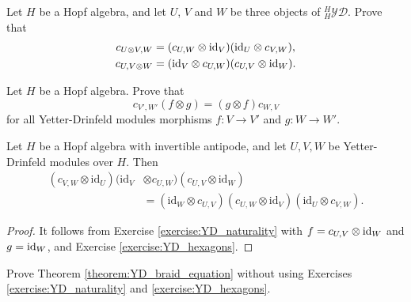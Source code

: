 \begin{exercise}
\label{exercise:YD_hexagons}
Let $H$ be a Hopf algebra, and let $U$, $V$ and $W$
be three objects of $_H^H\mathcal{YD}$. Prove that 
\begin{align}
c_{U\otimes V,W} & =(c_{U,W}\otimes\id_{V})(\id_{U}\otimes c_{V,W}),\label{eq:(cx1)(1xc)}\\
c_{U,V\otimes W} & =(\id_{V}\otimes c_{U,W})(c_{U,V}\otimes\id_{W}).\label{eq:(1xc)(cx1)}
\end{align}
\end{exercise}

\begin{exercise}
\label{exercise:YD_naturality}
Let $H$ be a Hopf algebra. Prove that 
\[
c_{V',W'}(f\otimes g)=(g\otimes f)c_{W,V}
\]
for all Yetter-Drinfeld modules morphisms $f:V\to V'$ and $g:W\to W'$. 
\end{exercise}

\begin{theorem}
\label{theorem:YD_braid_equation}
Let $H$ be a Hopf algebra with invertible antipode, and let $U,V,W$
be Yetter-Drinfeld modules over $H$. Then 
\begin{align*}
(c_{V,W}\otimes\textrm{id}_{U})(\textrm{id}_{V}&\otimes c_{U,W})(c_{U,V}\otimes\textrm{id}_{W})\\
&=(\textrm{id}_{W}\otimes c_{U,V})(c_{U,W}\otimes\textrm{id}_{V})(\textrm{id}_{U}\otimes c_{V,W}).
\end{align*}
\end{theorem}

\begin{proof}
It follows from Exercise \eqref{exercise:YD_naturality} with
$f=c_{U,V}\otimes\mathrm{id}_W$ and $g=\mathrm{id}_W$, and Exercise
\eqref{exercise:YD_hexagons}.
\end{proof}

\begin{exercise}
Prove Theorem \ref{theorem:YD_braid_equation} without using Exercises
\ref{exercise:YD_naturality} and \ref{exercise:YD_hexagons}.
\end{exercise}

